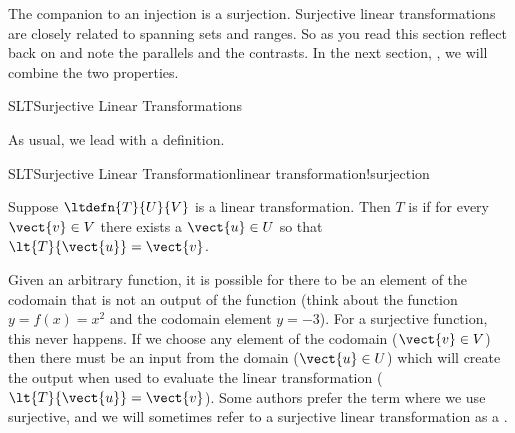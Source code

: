 %
\begin{introduction}
\begin{para}The companion to an injection is a surjection.  Surjective linear transformations are closely related to spanning sets and ranges.  So as you read this section reflect back on  and note the parallels and the contrasts.  In the next section, , we will combine the two properties.\end{para}
\end{introduction}
%
\begin{subsect}{SLT}{Surjective Linear Transformations}
%
\begin{para}As usual, we lead with a definition.\end{para}
%
\begin{definition}{SLT}{Surjective Linear Transformation}{linear transformation!surjection}
\begin{para}Suppose $\ltdefn{T}{U}{V}$ is a linear transformation.  Then $T$ is  if for every $\vect{v}\in V$ there exists a $\vect{u}\in U$ so that $\lt{T}{\vect{u}}=\vect{v}$.\end{para}
\end{definition}
%
\begin{para}Given an arbitrary function, it is possible for there to be an element of the codomain that is not an output of the function (think about the function $y=f(x)=x^2$ and the codomain element $y=-3$).  For a surjective function, this never happens.  If we choose any element of the codomain ($\vect{v}\in V$) then there must be an input from the domain ($\vect{u}\in U$) which will create the output when used to evaluate the linear transformation ($\lt{T}{\vect{u}}=\vect{v}$).  Some authors prefer the term  where we use surjective, and we will sometimes refer to a surjective linear transformation as a .\end{para}
%
\end{subsect}
%
